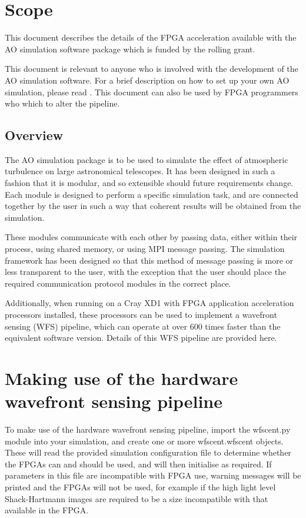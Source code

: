 \documentclass{article}
\begin{document}


\section{Scope}
This document describes the details of the FPGA acceleration available
with the AO simulation software package which is funded by the rolling
grant.

This document is relevant to anyone who is involved with the
development of the AO simulation software.  For a brief description on
how to set up your own AO simulation, please read \citet{dummies}.
This document can also be used by FPGA programmers who which to alter
the pipeline.

\subsection{Overview}

The AO simulation package is to be used to simulate the effect of
atmospheric turbulence on large astronomical telescopes.  It has been
designed in such a fashion that it is modular, and so extensible
should future requirements change.  Each module is designed to perform
a specific simulation task, and are connected together by the user in
such a way that coherent results will be obtained from the simulation.

These modules communicate with each other by passing data, either
within their process, using shared memory, or using MPI message
passing.  The simulation framework has been designed so that this
method of message passing is more or less transparent to the user,
with the exception that the user should place the required
communication protocol modules in the correct place.

Additionally, when running on a Cray XD1 with FPGA application
acceleration processors installed, these processors can be used to
implement a wavefront sensing (WFS) pipeline, which can operate at
over 600 times faster than the equivalent software version.  Details
of this WFS pipeline are provided here.
\section{Making use of the hardware wavefront sensing pipeline}
To make use of the hardware wavefront sensing pipeline, import the
wfscent.py module into your simulation, and create one or more
wfscent.wfscent objects.  These will read the provided simulation
configuration file to determine whether the FPGAs can and should be
used, and will then initialise as required.  If parameters in this
file are incompatible with FPGA use, warning messages will be printed
and the FPGAs will not be used, for example if the high light level
Shack-Hartmann images are required to be a size incompatible with that
available in the FPGA.  
\end{document}

